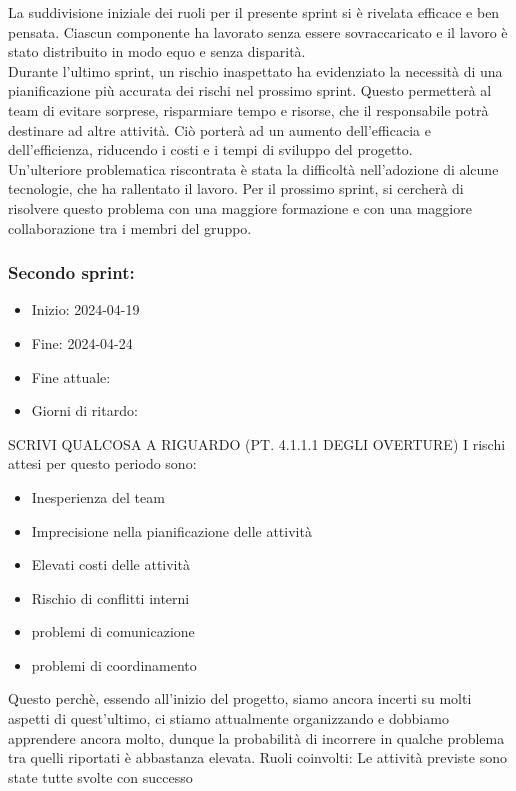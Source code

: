         La suddivisione iniziale dei ruoli per il presente sprint si è rivelata efficace e ben pensata. Ciascun componente ha lavorato senza essere sovraccaricato e il lavoro è stato distribuito in modo equo e senza disparità.\\
        Durante l’ultimo sprint, un rischio inaspettato ha evidenziato la necessità di una pianificazione più accurata dei rischi nel prossimo sprint. Questo permetterà al team di evitare sorprese, risparmiare tempo e risorse, che il responsabile potrà destinare ad altre attività. Ciò porterà ad un aumento dell’efficacia e dell’efficienza, riducendo i costi e i tempi di sviluppo del progetto.\\
        Un'ulteriore problematica riscontrata è stata la difficoltà nell'adozione di alcune tecnologie, che ha rallentato il lavoro. Per il prossimo sprint, si cercherà di risolvere questo problema con una maggiore formazione e con una maggiore collaborazione tra i membri del gruppo.\\
    \subsubsection{Secondo sprint:}
    \begin{itemize}
        \item Inizio: 2024-04-19
        \item Fine: 2024-04-24
        \item Fine attuale:
        \item Giorni di ritardo:
    \end{itemize}
    SCRIVI QUALCOSA A RIGUARDO (PT. 4.1.1.1 DEGLI OVERTURE)
    I rischi attesi per questo periodo sono:
    \begin{itemize}
        \item Inesperienza del team
        \item Imprecisione nella pianificazione delle attività
        \item Elevati costi delle attività
        \item Rischio di conflitti interni 
        \item problemi di comunicazione
        \item problemi di coordinamento
    \end{itemize}
    Questo perchè, essendo all’inizio del progetto, siamo ancora incerti su molti aspetti di quest’ultimo, ci stiamo attualmente organizzando e dobbiamo apprendere ancora molto, dunque la probabilità di incorrere in qualche problema tra quelli riportati è abbastanza elevata.
    Ruoli coinvolti: 
    Le attività previste sono state tutte svolte con successo


